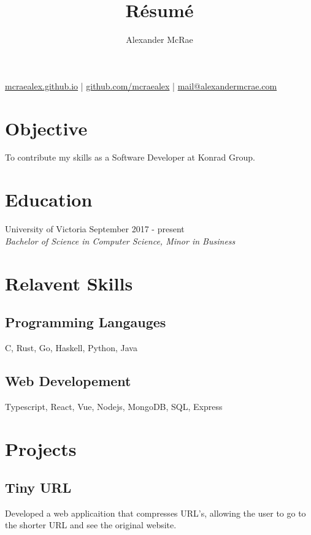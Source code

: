 \documentclass{article}
\makeatletter
\renewcommand{\maketitle}{
\begin{center}
{\huge \bfseries \theauthor}

\vspace{0.25em}
\url{mcraealex.github.io} | \url{github.com/mcraealex} | \href{mailto:mail@alexandermcrae.com}{mail@alexandermcrae.com}
\end{center}}
\newcommand{\hrefColored}[3]{\href{#2}{\color{#1}{#3}}}
\makeatother
\begin{document}
\title{R\'esum\'e}
\author{Alexander McRae}

\maketitle

\section{Objective}

\noindent To contribute my skills as a Software Developer at Konrad Group.

\section{Education}

\noindent University of Victoria \hfill September 2017 - present\\
\textit{Bachelor of Science in Computer Science, Minor in Business}

\section{Relavent Skills}

\subsection{Programming Langauges}

C, Rust, Go, Haskell, Python, Java

\subsection{Web Developement}

Typescript, React, Vue, Nodejs, MongoDB, SQL, Express

\section{Projects}

\subsection{Tiny URL \hrefColored{blue}{https://github.com/McRaeAlex/tinyURL}{github.com/McRaeAlex/tinyURL}}

Developed a web applicaition that compresses URL's, allowing the user to go to 
the shorter URL and see the original website.
\end{document}
